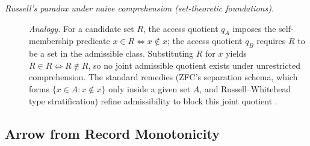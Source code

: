 \begin{description}
\item[\emph{Russell's paradox under naive
comprehension (set-theoretic foundations).}] \textit{Analogy.}
For a candidate set \(R\), the access quotient
\(q_A\) imposes the self-membership predicate
\(x\in R\iff x\notin x\); the access quotient
\(q_B\) requires \(R\) to be a set in the admissible
class.  Substituting \(R\) for \(x\) yields
\(R\in R\iff R\notin R\), so no joint admissible
quotient exists under unrestricted comprehension.
The standard remedies (ZFC's separation schema, which forms \(\{x\in A:x\notin x\}\) only inside a given set \(A\), and Russell--Whitehead type
stratification) refine admissibility to block this
joint quotient \citep{Russell1902Letter}.
\end{description}
\endgroup

\subsection*{ Arrow from Record Monotonicity}
\begingroup\small
